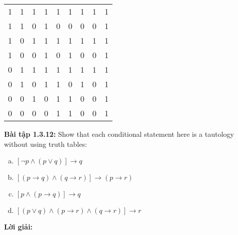 \documentclass[a4paper]{article}
\begin{document}
\begin{enumerate}
\begin{table} [h]
\begin{tabular} {|c|c|c|c|c|c|c|c|c|}
			\hline
			1&1&1&1&1&1&1&1&1\\
			1&1&0&1&0&0&0&0&1\\
			1&0&1&1&1&1&1&1&1\\
			1&0&0&1&0&1&0&0&1\\
			0&1&1&1&1&1&1&1&1\\
			0&1&0&1&1&0&1&0&1\\
			0&0&1&0&1&1&0&0&1\\
			0&0&0&0&1&1&0&0&1\\
			\hline			
		\end{tabular}
	\end{table}
\end{enumerate}
\textbf{Bài tập 1.3.12:} Show that each conditional statement here is a tautology without using truth tables: 
\begin{enumerate}[a)]
	\item $[\lnot p \land (p \lor q)] \rightarrow q$
	\item $[(p \rightarrow q) \land (q \rightarrow r)] \rightarrow (p \rightarrow r)$
	\item $[p \land (p \rightarrow q)] \rightarrow q$
	\item $[(p \lor q) \land (p \rightarrow r) \land (q \rightarrow r)] \rightarrow r$
\end{enumerate}
\textbf{Lời giải: }
\end{document}
